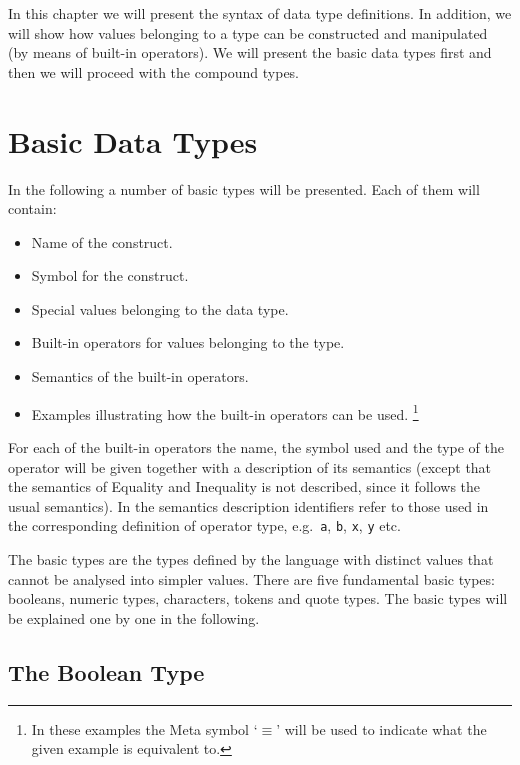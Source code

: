 \documentclass{overturerepchap}
\begin{document}
In this chapter we will present the syntax of data type
definitions. In addition, we will show how values belonging to a type
can be constructed and manipulated (by means of built-in operators).
We will present the basic data types first and then we will proceed
with the compound types.

\section{Basic Data Types}

In the following a number of basic types will be presented. Each of
them will contain:

\begin{itemize}
\item Name of the construct.
\item Symbol for the construct.
\item Special values belonging to the data type.
\item Built-in operators for values belonging to the type.
\item Semantics of the built-in operators.
\item Examples illustrating how the built-in operators can be used.%
  \footnote{In these examples the Meta symbol `$\equiv$' will be used
    to indicate what the given example is equivalent to.}
\end{itemize}
For each of the built-in operators the name, the symbol used and the
type of the operator will be given together with a description of its
semantics (except that the semantics of Equality and Inequality is not
described, since it follows the usual semantics). In the semantics
description identifiers refer to those used in the corresponding
definition of operator type, e.g.\ {\tt a}, {\tt b}, {\tt x}, {\tt y}
etc.

The basic types are the types defined by the language with distinct
values that cannot be analysed into simpler values. There are five
fundamental basic types: booleans, numeric types,
characters, tokens and quote types. The basic types will be explained one by
one in the following.

\subsection{The Boolean Type}\label{bool}
\end{document}
